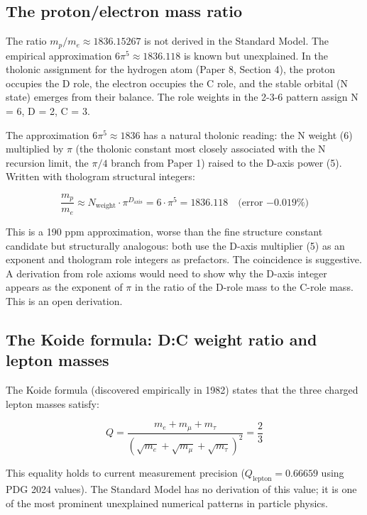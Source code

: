 \documentclass[12pt]{article}
\begin{document}
\subsection{The proton/electron mass ratio}\label{the-protonelectron-mass-ratio}

The ratio \(m_p / m_e \approx 1836.15267\) is not derived in the
Standard Model. The empirical approximation \(6\pi^5 \approx 1836.118\)
is known but unexplained. In the tholonic assignment for the hydrogen
atom (Paper 8, Section 4), the proton occupies the D role, the electron
occupies the C role, and the stable orbital (N state) emerges from their
balance. The role weights in the 2-3-6 pattern assign N = 6, D = 2, C =
3.

The approximation \(6\pi^5 \approx 1836\) has a natural tholonic
reading: the N weight (6) multiplied by \(\pi\) (the tholonic constant
most closely associated with the N recursion limit, the \(\pi/4\) branch
from Paper 1) raised to the D-axis power (5). Written with thologram
structural integers:

\[\frac{m_p}{m_e} \approx N_{\text{weight}} \cdot \pi^{D_{\text{axis}}} = 6 \cdot \pi^5 = 1836.118 \quad \text{(error } {-0.019\%)}\]

This is a 190 ppm approximation, worse than the fine structure constant
candidate but structurally analogous: both use the D-axis multiplier (5)
as an exponent and thologram role integers as prefactors. The
coincidence is suggestive. A derivation from role axioms would need to
show why the D-axis integer appears as the exponent of \(\pi\) in the
ratio of the D-role mass to the C-role mass. This is an open derivation.

\subsection{The Koide formula: D:C weight ratio and lepton masses}\label{the-koide-formula-dc-weight-ratio-and-lepton-masses}

The Koide formula (discovered empirically in 1982) states that the three
charged lepton masses satisfy:

\[Q = \frac{m_e + m_\mu + m_\tau}{(\sqrt{m_e} + \sqrt{m_\mu} + \sqrt{m_\tau})^2} = \frac{2}{3}\]

This equality holds to current measurement precision
(\(Q_{\text{lepton}} = 0.66659\) using PDG 2024 values). The Standard
Model has no derivation of this value; it is one of the most prominent
unexplained numerical patterns in particle physics.
\end{document}
